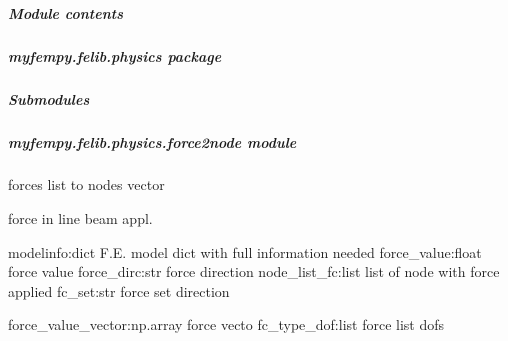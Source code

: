 \documentclass[letterpaper,10pt,english]{sphinxmanual}
\begin{document}
\subparagraph{Module contents}
\label{\detokenize{myfempy.felib.materials:module-myfempy.felib.materials}}\label{\detokenize{myfempy.felib.materials:module-contents}}
\sphinxstepscope


\subparagraph{myfempy.felib.physics package}
\label{\detokenize{myfempy.felib.physics:myfempy-felib-physics-package}}\label{\detokenize{myfempy.felib.physics::doc}}

\subparagraph{Submodules}
\label{\detokenize{myfempy.felib.physics:submodules}}

\subparagraph{myfempy.felib.physics.force2node module}
\label{\detokenize{myfempy.felib.physics:module-myfempy.felib.physics.force2node}}\label{\detokenize{myfempy.felib.physics:myfempy-felib-physics-force2node-module}}
\sphinxAtStartPar
forces list to nodes vector

\begin{fulllineitems}
\label{\detokenize{myfempy.felib.physics:myfempy.felib.physics.force2node.force_beam}}
\pysigstartsignatures
{}
\pysigstopsignatures
\sphinxAtStartPar
force in line beam appl.
\begin{description}
\sphinxAtStartPar
modelinfo:dict        \textendash{} F.E. model dict with full information needed
force\_value:float     \textendash{} force value
force\_dirc:str        \textendash{} force direction
node\_list\_fc:list     \textendash{} list of node with force applied
fc\_set:str            \textendash{} force set direction

\sphinxAtStartPar
force\_value\_vector:np.array  \textendash{} force vecto
fc\_type\_dof:list             \textendash{} force list dofs

\end{description}

\end{fulllineitems}
\end{document}
